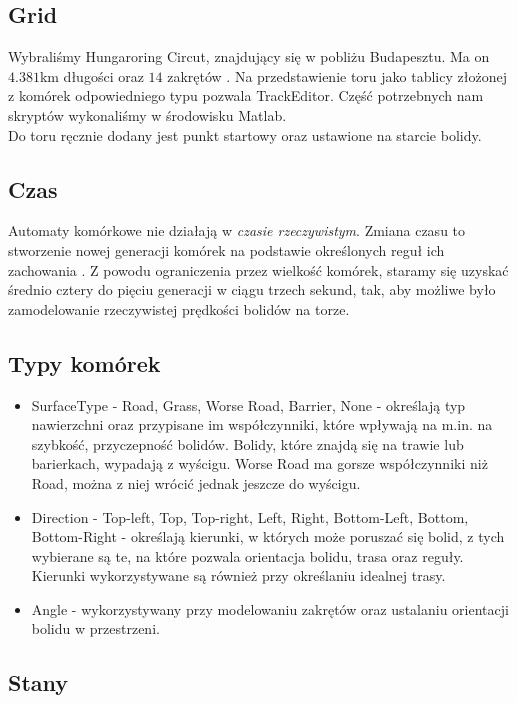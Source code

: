 \documentclass[12p]{extarticle}
\begin{document}
\subsection{Grid} 

Wybraliśmy Hungaroring Circut, znajdujący się w pobliżu Budapesztu. Ma on $4.381$km długości oraz $14$ zakrętów \cite{track}. Na przedstawienie toru jako tablicy złożonej z komórek odpowiedniego typu pozwala TrackEditor. Część potrzebnych nam skryptów wykonaliśmy w środowisku Matlab. \\

Do toru ręcznie dodany jest punkt startowy oraz ustawione na starcie bolidy.

\subsection{Czas}

Automaty komórkowe nie działają w \textit{czasie rzeczywistym}. Zmiana czasu to stworzenie nowej generacji komórek na podstawie określonych reguł ich zachowania \cite{nature}. Z powodu ograniczenia przez wielkość komórek, staramy się uzyskać średnio cztery do pięciu generacji w ciągu trzech sekund, tak, aby możliwe było zamodelowanie rzeczywistej prędkości bolidów na torze. 

\subsection{Typy komórek}
\begin{itemize}
\item SurfaceType - Road, Grass, Worse Road, Barrier, None - określają typ nawierzchni oraz przypisane im współczynniki, które wpływają na m.in. na szybkość, przyczepność bolidów. Bolidy, które znajdą się na trawie lub barierkach, wypadają z wyścigu. Worse Road ma gorsze współczynniki niż Road, można z niej wrócić jednak jeszcze do wyścigu.
\item Direction -  Top-left, Top, Top-right, Left, Right, Bottom-Left, Bottom, Bottom-Right - określają kierunki, w których może poruszać się bolid, z tych wybierane są te, na które pozwala orientacja bolidu, trasa oraz reguły. Kierunki wykorzystywane są również przy określaniu idealnej trasy.
\item Angle -  wykorzystywany przy modelowaniu zakrętów oraz ustalaniu orientacji bolidu w przestrzeni.
\end{itemize}

\subsection{Stany}
\end{document}
